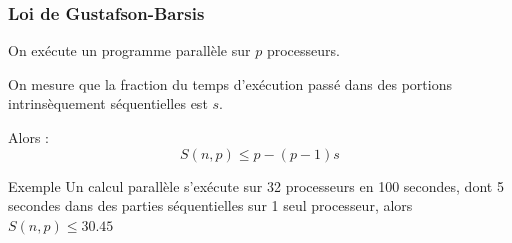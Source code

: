\documentclass[xcolor={x11names,svgnames}]{beamer}
\begin{document}

\begin{frame}
  \frametitle{Loi de Gustafson-Barsis}

  On exécute un programme parallèle sur $p$ processeurs.

  \medskip
  
  On mesure que la fraction du temps d'exécution passé dans des portions
  intrinsèquement séquentielles est $s$.

  \medskip
  
  Alors :
  \[
    S(n, p)  \leq  p - (p-1)s
  \]

    \medskip
  
    \begin{block}{Exemple}
      Un calcul parallèle s'exécute sur 32 processeurs en 100
      secondes, dont 5 secondes dans des parties séquentielles sur 1 seul
      processeur, alors $ S(n, p)  \leq 30.45$
    \end{block}
  \end{frame}


\end{document}
